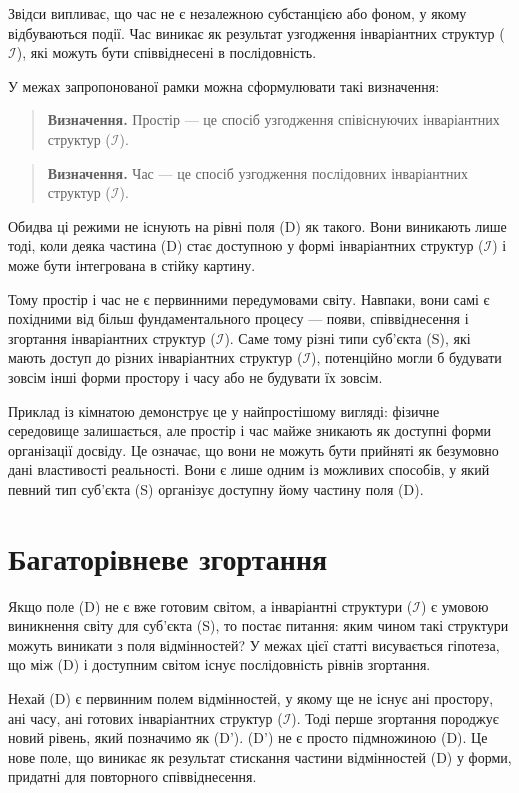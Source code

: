 \documentclass[aps,prd,onecolumn,nofootinbib,superscriptaddress]{revtex4-2}
\begin{document}
Звідси випливає, що час не є незалежною субстанцією або фоном, у якому відбуваються події. Час виникає як результат узгодження інваріантних структур ($\mathcal{I}$), які можуть бути співвіднесені в послідовність.

У межах запропонованої рамки можна сформулювати такі визначення:

\begin{quote}
\textbf{Визначення.}
Простір — це спосіб узгодження співіснуючих інваріантних структур ($\mathcal{I}$).
\end{quote}

\begin{quote}
\textbf{Визначення.}
Час — це спосіб узгодження послідовних інваріантних структур ($\mathcal{I}$).
\end{quote}

Обидва ці режими не існують на рівні поля (D) як такого. Вони виникають лише тоді, коли деяка частина (D) стає доступною у формі інваріантних структур ($\mathcal{I}$) і може бути інтегрована в стійку картину.

Тому простір і час не є первинними передумовами світу. Навпаки, вони самі є похідними від більш фундаментального процесу — появи, співвіднесення і згортання інваріантних структур ($\mathcal{I}$). Саме тому різні типи суб’єкта (S), які мають доступ до різних інваріантних структур ($\mathcal{I}$), потенційно могли б будувати зовсім інші форми простору і часу або не будувати їх зовсім.

Приклад із кімнатою демонструє це у найпростішому вигляді: фізичне середовище залишається, але простір і час майже зникають як доступні форми організації досвіду. Це означає, що вони не можуть бути прийняті як безумовно дані властивості реальності. Вони є лише одним із можливих способів, у який певний тип суб’єкта (S) організує доступну йому частину поля (D).

\section{Багаторівневе згортання}
Якщо поле (D) не є вже готовим світом, а інваріантні структури ($\mathcal{I}$) є умовою виникнення світу для суб’єкта (S), то постає питання: яким чином такі структури можуть виникати з поля відмінностей? У межах цієї статті висувається гіпотеза, що між (D) і доступним світом існує послідовність рівнів згортання.

Нехай (D) є первинним полем відмінностей, у якому ще не існує ані простору, ані часу, ані готових інваріантних структур ($\mathcal{I}$). Тоді перше згортання породжує новий рівень, який позначимо як (D'). (D') не є просто підмножиною (D). Це нове поле, що виникає як результат стискання частини відмінностей (D) у форми, придатні для повторного співвіднесення.
\end{document}

